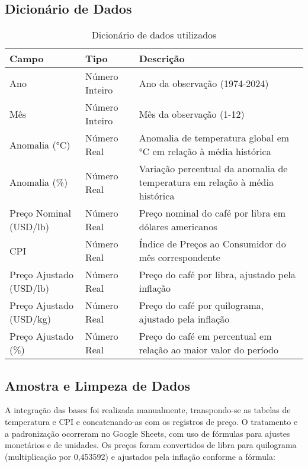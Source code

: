 \documentclass[12pt]{article}
\begin{document}
\subsection{Dicionário de Dados}
\begin{table}[ht]
\centering
\caption{Dicionário de dados utilizados}
\begin{tabular}{l l p{8cm}}
\hline
\textbf{Campo} & \textbf{Tipo} & \textbf{Descrição} \\
\hline
Ano & Número Inteiro & Ano da observação (1974-2024) \\

Mês & Número Inteiro & Mês da observação (1-12) \\

Anomalia (°C) & Número Real & Anomalia de temperatura global em °C em relação à média histórica \\

Anomalia (\%) & Número Real & Variação percentual da anomalia de temperatura em relação à média histórica \\

Preço Nominal (USD/lb) & Número Real & Preço nominal do café por libra em dólares americanos \\

CPI & Número Real & Índice de Preços ao Consumidor do mês correspondente \\

Preço Ajustado (USD/lb) & Número Real & Preço do café por libra, ajustado pela inflação \\

Preço Ajustado (USD/kg) & Número Real & Preço do café por quilograma, ajustado pela inflação \\

Preço Ajustado (\%) & Número Real & Preço do café em percentual em relação ao maior valor do período \\
\hline
\end{tabular}
\end{table}

\subsection{Amostra e Limpeza de Dados}
A integração das bases foi realizada manualmente, transpondo-se as tabelas de temperatura e CPI e concatenando-as com os registros de preço. O tratamento e a padronização ocorreram no Google Sheets, com uso de fórmulas para ajustes monetários e de unidades. Os preços foram convertidos de libra para quilograma (multiplicação por 0,453592) e ajustados pela inflação conforme a fórmula:
\end{document}
